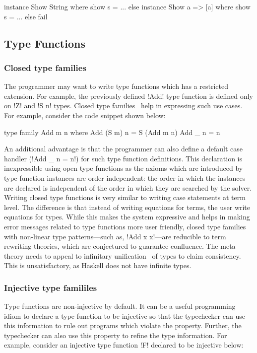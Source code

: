 \documentclass[screen,nonacm,manuscript,review]{acmart} %
\begin{document}
\begin{CenteredBox}
\begin{code}
instance Show String where show s = ...
else instance Show a => [a] where show s = ...
else fail
\end{code}
\end{CenteredBox}

\subsection{Type Functions}\label{sec:rw-type-fun}
\subsubsection{Closed type families}
The programmer may want to write type functions which has a restricted
extension. For example, the previously defined !Add! type
function is defined only on !Z! and !S n! types. Closed type
families~\cite{eisenberg_typefamilies_2014} help in
expressing such use cases. For example, consider the code snippet shown below:

\begin{CenteredBox}
\begin{code}
type family Add m n where
  Add (S m) n = S (Add m n)
  Add _ n = n
\end{code}
\end{CenteredBox}

An additional advantage is that the programmer can also define a
default case handler (!Add _ n = n!) for such type function
definitions. This declaration is inexpressible using open type
functions as the axioms which are introduced by type function
instances are order independent: the order in which the instances
are declared is independent of the order in which they are searched by
the solver. Writing closed type functions is very similar to writing case
statements at term level. The difference is that instead of writing
equations for terms, the user write equations for types. While this
makes the system expressive and helps in making error messages related
to type functions more user friendly, closed type families with
non-linear type patterns---such as, !Add x x!---are reducible to
term rewriting theories\cite{mizuhito_rta_1995}, which are conjectured
to guarantee confluence. The meta-theory needs to appeal to infinitary
unification~\cite{jaffar_efficient_1984} of types to claim
consistency. This is unsatisfactory, as Haskell does not have
infinite types.

\subsubsection{Injective type famililes}
Type functions are non-injective by default. It can be a useful
programming idiom to declare a type function to be injective so that
the typechecker can use this information to rule out programs which
violate the property. Further, the typechecker can also use this
property to refine the type information. For example, consider an
injective type function !F! declared to be injective below:
\end{document}
